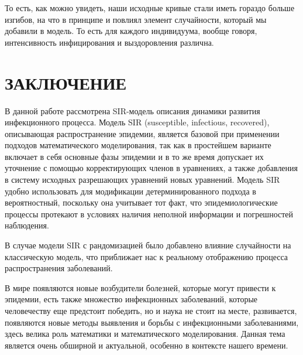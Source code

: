 \documentclass[a4paper, 12pt]{extarticle}
\numberwithin{equation}{section}
\begin{document}
	То есть, как можно увидеть, наши исходные кривые стали иметь гораздо больше изгибов, на что в принципе и повлиял элемент случайности, который мы добавили в модель. То есть для каждого индивидуума, вообще говоря, интенсивность инфицирования и выздоровления различна.
	\newpage
	\section*{ЗАКЛЮЧЕНИЕ}
	В данной работе рассмотрена SIR-модель описания динамики развития инфекционного процесса. Модель SIR (susceptible, infectious, recovered), описывающая распространение эпидемии, является базовой при применении подходов математического моделирования, так как в простейшем варианте включает в себя основные фазы эпидемии и в то же время допускает их уточнение с помощью корректирующих членов в уравнениях, а также добавления в систему исходных разрешающих уравнений новых уравнений. Модель SIR удобно использовать для модификации детерминированного подхода в вероятностный, поскольку она учитывает тот факт, что эпидемиологические процессы протекают в условиях наличия неполной информации и погрешностей наблюдения. 
	
	В случае модели SIR с рандомизацией было добавлено влияние случайности на классическую модель, что приближает нас к реальному отображению процесса распространения заболеваний.
	
	В мире появляются новые возбудители
	болезней, которые могут привести к эпидемии, есть также множество инфекционных заболеваний, которые человечеству
	еще предстоит победить, но и наука не
	стоит на месте, развивается, появляются
	новые методы выявления и борьбы с инфекционными заболеваниями, здесь велика роль математики и математического
	моделирования. Данная тема является
	очень обширной и актуальной, особенно в
	контексте нашего времени.
	\newpage
\end{document}
